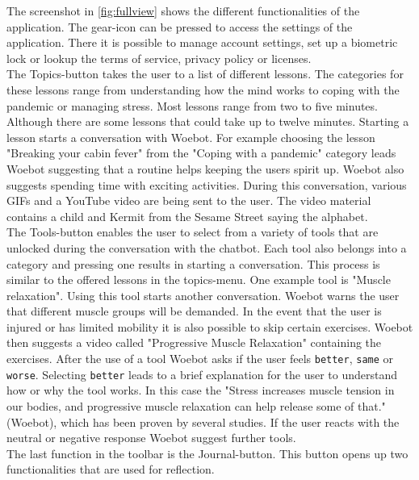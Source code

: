 The screenshot in \autoref{fig:fullview} shows the different functionalities of the application.
The gear-icon can be pressed to access the settings of the application.
There it is possible to manage account settings, set up a biometric lock or lookup the terms of service, privacy policy or licenses.\\

The Topics-button takes the user to a list of different lessons.
The categories for these lessons range from understanding how the mind works to coping with the pandemic or managing stress.
Most lessons range from two to five minutes.
Although there are some lessons that could take up to twelve minutes.
Starting a lesson starts a conversation with Woebot.
For example choosing the lesson "Breaking your cabin fever" from the "Coping with a pandemic" category leads Woebot suggesting that a routine helps keeping the users spirit up.
Woebot also suggests spending time with exciting activities.
During this conversation, various GIFs and a YouTube video are being sent to the user.
The video material contains a child and Kermit from the Sesame Street saying the alphabet. \\

The Tools-button enables the user to select from a variety of tools that are unlocked during the conversation with the chatbot.
Each tool also belongs into a category and pressing one results in starting a conversation.
This process is similar to the offered lessons in the topics-menu. One example tool is "Muscle relaxation".
Using this tool starts another conversation. Woebot warns the user that different muscle groups will be demanded.
In the event that the user is injured or has limited mobility it is also possible to skip certain exercises.
Woebot then suggests a video called "Progressive Muscle Relaxation" containing the exercises.
After the use of a tool Woebot asks if the user feels \texttt{better}, \texttt{same} or \texttt{worse}.
Selecting \texttt{better} leads to a brief explanation for the user to understand how or why the tool works.
In this case the "Stress increases muscle tension in our bodies, and progressive muscle relaxation can help release some of that." (Woebot), which has been proven by several studies\cite{progressive-muscle, stress-pmr}.
If the user reacts with the neutral or negative response Woebot suggest further tools.\\

The last function in the toolbar is the Journal-button. This button opens up two functionalities that are used for reflection. 

